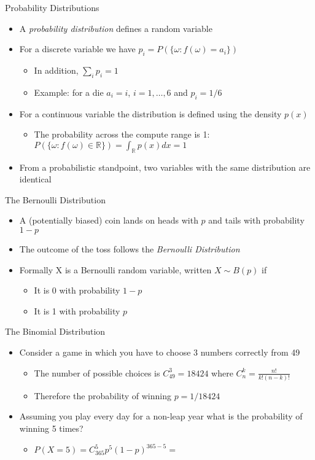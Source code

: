 \documentclass{beamer}
\begin{document}
\begin{frame}{Probability Distributions} 
\begin{itemize}
\item A \emph{probability distribution} defines a random variable 
\item For a discrete variable we have $p_i = P(\{\omega: f(\omega) = a_i\})$
\begin{itemize}
\item In addition, $\sum_i p_i  = 1$
\item Example: for a die $a_i = i$, $i=1,\ldots, 6$ and $p_i = 1/6$
\end{itemize}
\item For a continuous variable the distribution is defined using the density $p(x)$
\begin{itemize}
\item The probability across the compute range is 1: $P(\{\omega: f(\omega) \in \mathbb{R}\}) = \int_\mathbb{R} p(x) dx = 1$ 
\end{itemize}
\item From a probabilistic standpoint, two variables with the same distribution are identical 
\end{itemize}
\end{frame}

\begin{frame}{The Bernoulli Distribution}
\begin{itemize}
 \item A (potentially biased) coin lands on heads with $p$ and tails with probability $1-p$
\item The outcome of the toss follows the \emph{Bernoulli Distribution} 
\item Formally X is a Bernoulli random variable, written $X \sim B(p)$ if 
\begin{itemize}
\item It is 0 with probability $1-p$ 
\item It is 1 with probability $p$ 
\end{itemize} 
\end{itemize}
\end{frame}


\begin{frame}{The Binomial Distribution}  
\begin{itemize} 
 \item Consider a game in which you have to choose 3 numbers correctly from 49 
\begin{itemize}
\item The number of possible choices is $C^3_{49} = 18424$ where $C^k_n =\frac{n!}{k!(n-k)!}$
\item Therefore the probability of winning $p = 1/18424$
\end{itemize}
\item Assuming you play every day for a non-leap year what is the probability of winning 5 times? 
\begin{itemize}
\item $P(X = 5) = C^5_365 p^5 (1-p)^{365-5} = $
\end{itemize}
\end{itemize}
\end{frame}
\end{document}
